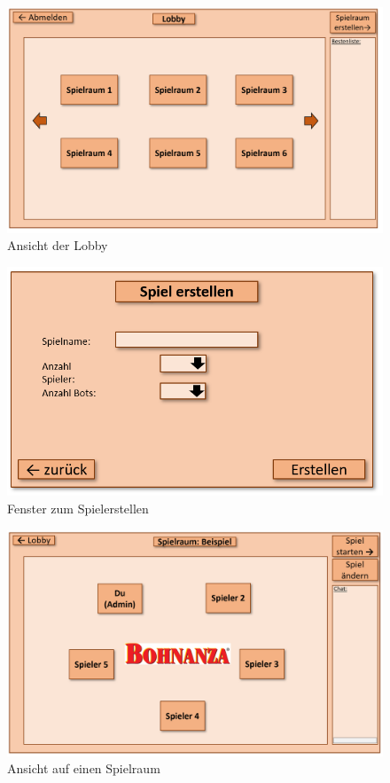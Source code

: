 \begin{figure}
	\centering
	\includegraphics{img/lob}
	\caption{Ansicht der Lobby}
	\label{gui:lob}
\end{figure}

\begin{figure}
	\centering
	\includegraphics{img/spielerst}
	\caption{Fenster zum Spielerstellen}
	\label{gui:spielerst}
\end{figure}

\begin{figure}
	\centering
	\includegraphics{img/spielr}
	\caption{Ansicht auf einen Spielraum}
	\label{gui:spielr}
\end{figure}

